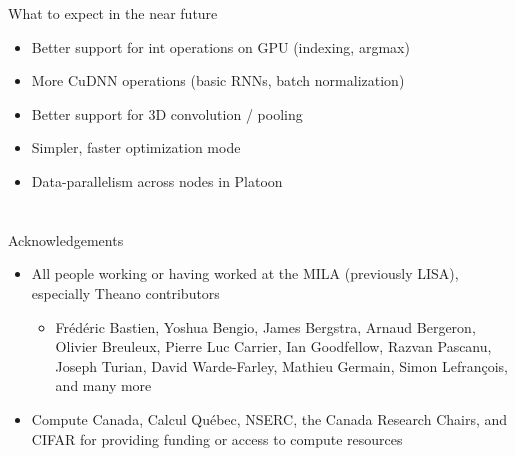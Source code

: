 \documentclass[a4paper,9pt]{beamer}
\begin{document}
\begin{frame}[fragile]{What to expect in the near future}
  \begin{itemize}
    \item Better support for int operations on GPU (indexing, argmax)
    \item More CuDNN operations (basic RNNs, batch normalization)
    \item Better support for 3D convolution / pooling
    \item Simpler, faster optimization mode
    \item Data-parallelism across nodes in Platoon
  \end{itemize}
\end{frame}


\section{}

\begin{frame}{Acknowledgements}
  \begin{itemize}
    \item All people working or having worked at the MILA (previously LISA), especially Theano contributors
      \begin{itemize}
        \item
          Frédéric Bastien,
          Yoshua Bengio,
          James Bergstra,
          Arnaud Bergeron,
          Olivier Breuleux,
          Pierre Luc Carrier,
          Ian Goodfellow,
          Razvan Pascanu,
          Joseph Turian,
          David Warde-Farley,
          Mathieu Germain,
          Simon Lefrançois,
          and many more
      \end{itemize}
    \item Compute Canada, Calcul Québec, NSERC, the Canada Research Chairs, and CIFAR for providing funding or access to compute resources
  \end{itemize}
\end{frame}
\end{document}
